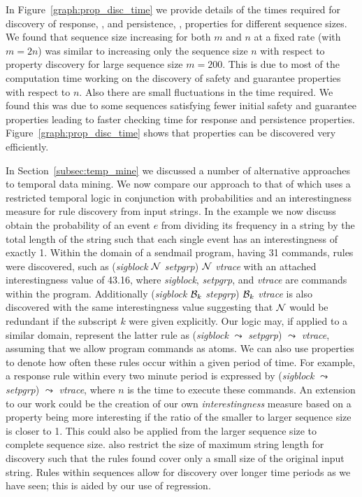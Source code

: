 In Figure~\ref{graph:prop_disc_time} we provide details of the times
required for discovery of response, , and persistence, ,
properties for different sequence 
sizes. We found that sequence size increasing for both $m$ and $n$ at
a fixed rate (with $m = 2n$) was
similar to increasing only the sequence size $n$ with respect to
property discovery for large sequence size $m = 200$. This is due to
most of the computation 
time working on the discovery of safety and guarantee properties with
respect to $n$. Also there are small fluctuations in the time
required. We found this was due to some sequences satisfying fewer
initial safety and guarantee properties leading to faster checking
time for response and persistence
properties. Figure~\ref{graph:prop_disc_time} shows that properties
can be discovered very efficiently.

\medskip
In Section~\ref{subsec:temp_mine} we discussed a number of alternative
approaches to temporal data mining. We now compare our approach to
that of \cite{bt98} which uses a restricted temporal logic in conjunction with
probabilities and an interestingness measure for rule discovery from
input strings. In the example we 
now discuss \cite{bt98} obtain the probability of an event $e$ from
dividing its frequency in a string by the total length of the string
such that each {single} event has an interestingness of exactly 1.
Within the domain of a {\ttb sendmail\tte} program, having 31
commands, rules were discovered, such as ({\em sigblock} ${\cal N}$
{\em setpgrp}) ${\cal N}$ {\em vtrace} 
with an attached interestingness value of 43.16, where
{\em sigblock}, {\em setpgrp}, and {\em vtrace} are commands within the
program. Additionally ({\em sigblock} ${\cal B}_k$ {\em stepgrp}) ${\cal B}_k$
{\em vtrace} is also discovered with the same interestingness value
suggesting that $\cal N$ would be redundant if the subscript $k$ were
given explicitly. Our logic may, if applied to a similar domain,
represent the latter rule as ({\em sigblock} $\leadsto$ {\em setpgrp})
$\leadsto$ {\em vtrace}, assuming 
that we allow program commands as atoms. We can also
use properties to denote how often these rules occur within a
given period of time. For example, a response rule within every two
minute period is expressed by  ({\em sigblock} $\leadsto$
{\em setpgrp}) $\leadsto$ 
{\em vtrace}, where $n$ is the time to execute these commands. An extension
to our work could be the creation of our own {\em interestingness}
measure based on a property being more interesting if the ratio of the
smaller to larger sequence size is closer to 1. This could also be
applied from the larger sequence size to complete sequence size.
\cite{bt98}
also restrict the size of maximum string length for discovery such
that the rules found cover only a small size of the original input
string. Rules within sequences allow for discovery over longer time
periods as we have seen; this is aided by our use of regression.

